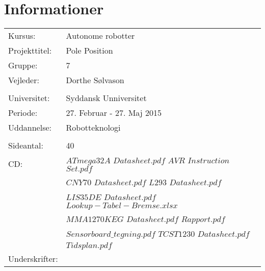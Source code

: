 \section*{Informationer}
\begin{tabularx}{\hsize}{lX}
Kursus:		    &	Autonome robotter\\
Projekttitel:	&	Pole Position\\
Gruppe:			&	7\\
Vejleder:		&	Dorthe Sølvason\\
\\
Universitet:	&	Syddansk Unniversitet\\
Periode:		&	27. Februar - 27. Maj 2015\\
Uddannelse:		&	Robotteknologi\\
\\
Sideantal:		&	40 \\
CD:				&	$ATmega32A$ $Datasheet.pdf$     \hspace{1.85cm}   $AVR$ $Instruction$ $Set.pdf$ \\
                &   $CNY70$ $Datasheet.pdf$         \hspace{2.6cm}   $L293$ $Datasheet.pdf$ \\
                &   $LIS35DE$ $Datasheet.pdf$       \hspace{2.3cm}   $Lookup-Tabel-Bremse.xlsx$ \\
                &   $MMA1270KEG$ $Datasheet.pdf$    \hspace{1.05cm}   $Rapport.pdf$ \\
                &   $Sensorboard\_tegning.pdf$      \hspace{2.1cm}   $TCST1230$ $Datasheet.pdf$ \\
                &   $Tidsplan.pdf$

\\

Underskrifter:\\
\end{tabularx}
\vspace{1.3cm}


